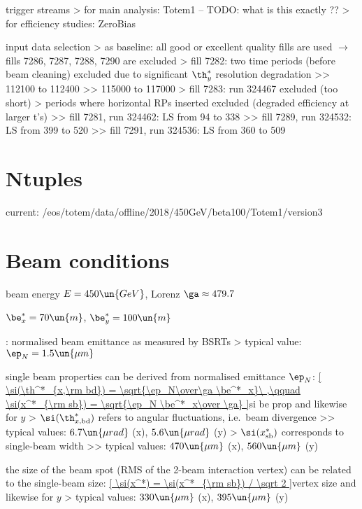 \> trigger streams
\>> for main analysis: Totem1 -- TODO: what is this exactly ??
\>> for efficiency studies: ZeroBias

\> input data selection
\>> as baseline: all good or excellent quality fills are used $\rightarrow$ fills 7286, 7287, 7288, 7290 are excluded
\>> fill 7282: two time periods (before beam cleaning) excluded due to significant $\th^*_y$ resolution degradation
\>>> 112100 to 112400
\>>> 115000 to 117000
\>> fill 7283: run 324467 excluded (too short)
\>> periods where horizontal RPs inserted excluded (degraded efficiency at larger t's)
\>>> fill 7281, run 324462: LS from 94 to 338
\>>> fill 7289, run 324532: LS from 399 to 520
\>>> fill 7291, run 324536: LS from 360 to 509



\chapter[ntuples]{Ntuples}

\> current: /eos/totem/data/offline/2018/450GeV/beta100/Totem1/version3



\chapter[beam-cond]{Beam conditions}

\> beam energy $E = 450\un{GeV}$, Lorenz $\ga \approx 479.7$

\> $\be^*_x = 70\un{m}$, $\be^*_y = 100\un{m}$

\> : normalised beam emittance as measured by BSRTs
\>> typical value: $\ep_N = 1.5\un{\mu m}$

\> single beam properties can be derived from normalised emittance $\ep_N$:
\eqref{
\si(\th^*_{x,\rm bd}) = \sqrt{\ep_N\over\ga \be^*_x}\ ,\qquad \si(x^*_{\rm sb}) = \sqrt{\ep_N \be^*_x\over \ga}
}{si be prop}
and likewise for $y$
\>> $\si(\th^*_{x,\rm bd})$ refers to angular fluctuations, i.e.~beam divergence
\>>> typical values: $6.7\un{\mu rad}$ (x), $5.6\un{\mu rad}$ (y)
\>> $\si(x^*_{\rm sb})$ corresponds to single-beam width
\>>> typical values: $470\un{\mu m}$ (x), $560\un{\mu m}$ (y)

\> the size of the beam spot (RMS of the 2-beam interaction vertex) can be related to the single-beam size:
\eqref{
\si(x^*) = \si(x^*_{\rm sb}) / \sqrt 2
}{vertex size}
and likewise for $y$
\>> typical values: $330\un{\mu m}$ (x), $395\un{\mu m}$ (y)

